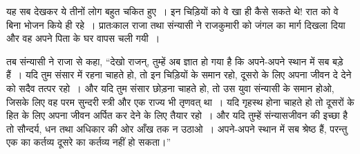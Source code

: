 यह सब देखकर ये तीनों लोग बहुत चकित हुए~। इन चिड़ियों को वे खा ही कैसे सकते थे! रात को वे बिना भोजन किये ही रहे~। प्रातःकाल राजा तथा संन्यासी ने राजकुमारी को जंगल का मार्ग दिखला दिया और वह अपने पिता के घर वापस चली गयी~।

तब संन्यासी ने राजा से कहा, “देखो राजन्, तुम्हें अब ज्ञात हो गया है कि अपने-अपने स्थान में सब बड़े हैं~। यदि तुम संसार में रहना चाहते हो, तो इन चिड़ियों के समान रहो, दूसरो के लिए अपना जीवन दे देने को सदैव तत्पर रहो~। और यदि तुम संसार छोड़ना चाहते हो, तो उस युवा संन्यासी के समान होओ, जिसके लिए वह परम सुन्दरी स्त्री और एक राज्य भी तृणवत् था~। यदि गृहस्थ होना चाहते हो तो दूसरों के हित के लिए अपना जीवन अर्पित कर देने के लिए तैयार रहो~। और यदि तुम्हें संन्यासजीवन की इच्छा है तो सौन्दर्य, धन तथा अधिकार की ओर आँख तक न उठाओ~। अपने-अपने स्थान में सब श्रेष्ठ हैं, परन्तु एक का कर्तव्य दूसरे का कर्तव्य नहीं हो सकता।”


